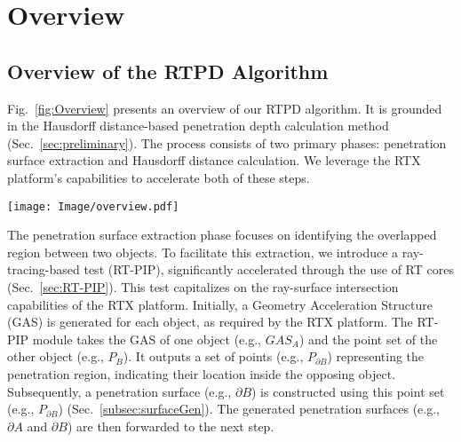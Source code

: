 \section{Overview}




\subsection{Overview of the RTPD Algorithm}\label{subsec:algo_overview}
Fig.~\ref{fig:Overview} presents an overview of our RTPD algorithm.
It is grounded in the Hausdorff distance-based penetration depth calculation method (Sec.~\ref{sec:preliminary}).
The process consists of two primary phases: penetration surface extraction and Hausdorff distance calculation.
We leverage the RTX platform's capabilities to accelerate both of these steps.

\begin{figure*}[t]
    \centering
    \texttt{[image: Image/overview.pdf]}
    \caption{The overview of RT-based penetration depth calculation algorithm overview}
    \label{fig:Overview}
\end{figure*}

The penetration surface extraction phase focuses on identifying the overlapped region between two objects.
To facilitate this extraction, we introduce a ray-tracing-based  test (RT-PIP), significantly accelerated through the use of RT cores (Sec.~\ref{sec:RT-PIP}).
This test capitalizes on the ray-surface intersection capabilities of the RTX platform.
%
Initially, a Geometry Acceleration Structure (GAS) is generated for each object, as required by the RTX platform.
The RT-PIP module takes the GAS of one object (e.g., $GAS_{A}$) and the point set of the other object (e.g., $P_{B}$).
It outputs a set of points (e.g., $P_{\partial B}$) representing the penetration region, indicating their location inside the opposing object.
Subsequently, a penetration surface (e.g., $\partial B$) is constructed using this point set (e.g., $P_{\partial B}$) (Sec.~\ref{subsec:surfaceGen}).
%
The generated penetration surfaces (e.g., $\partial A$ and $\partial B$) are then forwarded to the next step. 

